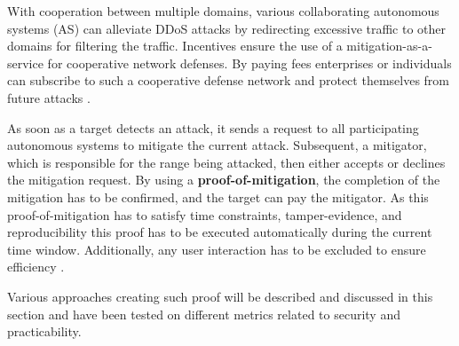 With cooperation between multiple domains, various collaborating autonomous systems (AS) can alleviate DDoS attacks by redirecting excessive traffic to other domains for filtering the traffic. Incentives ensure the use of a mitigation-as-a-service for cooperative network defenses. By paying fees enterprises or individuals can subscribe to such a cooperative defense network and protect themselves from future attacks \cite{Mannhart2018}.

As soon as a target detects an attack, it sends a request to all participating autonomous systems to mitigate the current attack. Subsequent, a mitigator, which is responsible for the range being attacked, then either accepts or declines the mitigation request. By using a \textbf{proof-of-mitigation}, the completion of the mitigation has to be confirmed, and the target can pay the mitigator. As this proof-of-mitigation has to satisfy time constraints, tamper-evidence, and reproducibility this proof has to be executed automatically during the current time window. Additionally, any user interaction has to be excluded to ensure efficiency \cite{Mannhart2018}.

Various approaches creating such proof will be described and discussed in this section and have been tested on different metrics related to security and practicability.


